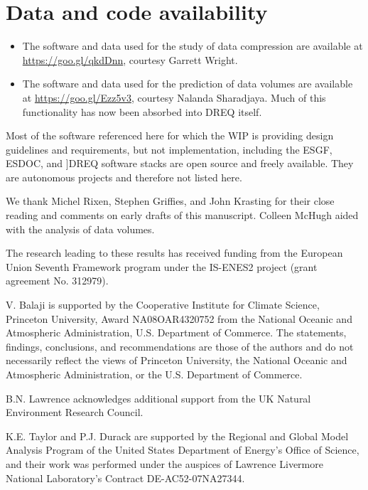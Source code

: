 \documentclass[gmd,manuscript]{copernicus}
\begin{document}
\section{Data and code availability}
\label{sec:code}

\begin{itemize}
\item The software and data used for the study of data compression are
  available at \url{https://goo.gl/qkdDnn}, courtesy Garrett Wright.
\item The software and data used for the prediction of data volumes
  are available at \url{https://goo.gl/Ezz5v3}, courtesy Nalanda
  Sharadjaya. Much of this functionality has now been absorbed into
  DREQ itself.
\end{itemize}

Most of the software referenced here for which the WIP is providing
design guidelines and requirements, but not implementation, including
the ESGF, ESDOC, and ]DREQ software stacks are open source and freely
available. They are autonomous projects and therefore not listed here.

\begin{acknowledgements}
  We thank Michel Rixen, Stephen Griffies, and John Krasting for their
  close reading and comments on early drafts of this manuscript.
  Colleen McHugh aided with the analysis of data volumes.
  
  The research leading to these results has received funding from the
  European Union Seventh Framework program under the IS-ENES2 project
  (grant agreement No. 312979).

  V. Balaji is supported by the Cooperative Institute for Climate
  Science, Princeton University, Award NA08OAR4320752 from the
  National Oceanic and Atmospheric Administration, U.S. Department of
  Commerce. The statements, findings, conclusions, and recommendations
  are those of the authors and do not necessarily reflect the views of
  Princeton University, the National Oceanic and Atmospheric
  Administration, or the U.S. Department of Commerce.

  B.N. Lawrence acknowledges additional support from the UK Natural
  Environment Research Council.
  
  K.E. Taylor and P.J. Durack are supported by the Regional and Global
  Model Analysis Program of the United States Department of Energy's
  Office of Science, and their work was performed under the auspices
  of Lawrence Livermore National Laboratory's Contract
  DE-AC52-07NA27344.
\end{acknowledgements}
\end{document}
